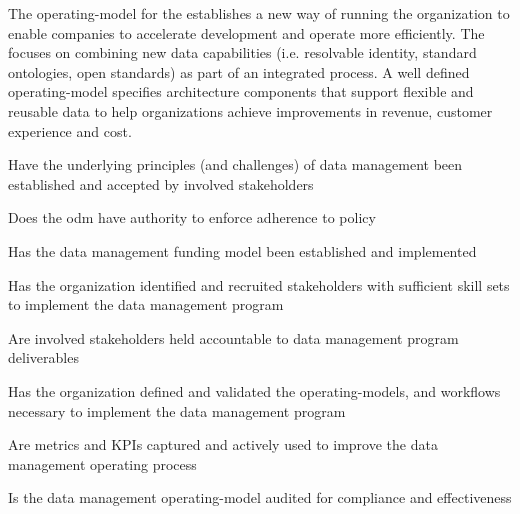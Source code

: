 %
%

\ekgmmCapabilitySectionContributionToEnterprise

The \gls{operating-model} for the  establishes a new way of running the organization
to enable companies to accelerate development and operate more efficiently.
The   focuses on
combining new data capabilities (i.e. resolvable identity, standard ontologies, open standards)
as part of an integrated process.
A well defined \gls{operating-model} specifies architecture components that support flexible and reusable data to help
organizations achieve improvements in revenue, customer experience and cost.

\ekgmmCapabilitySectionDimensions

\begin{core-questions}

  \item [\thesection.1] Have the underlying principles (and challenges) of data management been established and
                        accepted by involved stakeholders
  \item [\thesection.2] Does the \gls{odm} have authority to enforce adherence to policy
  \item [\thesection.3] Has the data management funding model been established and implemented
  \item [\thesection.4] Has the organization identified and recruited stakeholders with sufficient skill sets to
                        implement the data management program
  \item [\thesection.5] Are involved stakeholders held accountable to data management program deliverables
  \item [\thesection.6] Has the organization defined and validated the \glspl{operating-model},
                        and workflows necessary to implement the data management program
  \item [\thesection.7] Are metrics and KPIs captured and actively used to improve the data management operating process
  \item [\thesection.8] Is the data management \gls{operating-model} audited for compliance and effectiveness

\end{core-questions}

